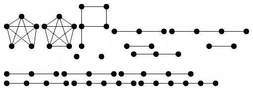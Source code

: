 \documentclass[11pt,paper=b5,footinclude,headinclude]{scrbook} %
\begin{document}
{\includegraphics[scale=0.5,frame]{smallGraphs/g_K5-e.png}     
\includegraphics[scale=0.5,frame]{smallGraphs/g_K5.png}     
\includegraphics[scale=0.5,frame]{smallGraphs/g_P.png}     
\includegraphics[scale=0.5,frame]{smallGraphs/g_P2UP3.png}     
\includegraphics[scale=0.5,frame]{smallGraphs/g_P2UP4.png}     
\includegraphics[scale=0.5,frame]{smallGraphs/g_P3.png}     
\includegraphics[scale=0.5,frame]{smallGraphs/g_P3U2K1.png}     
\includegraphics[scale=0.5,frame]{smallGraphs/g_P3UP4.png}     
\includegraphics[scale=0.5,frame]{smallGraphs/g_P4.png}     
\includegraphics[scale=0.5,frame]{smallGraphs/g_P5.png}     
\includegraphics[scale=0.5,frame]{smallGraphs/g_P6.png}     
}
\end{document}
